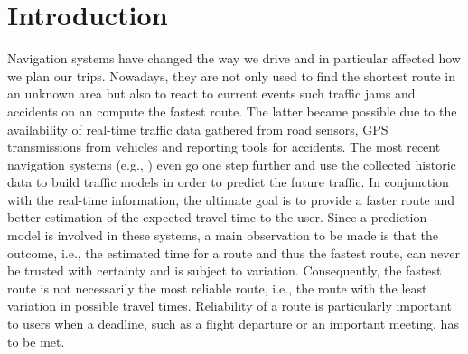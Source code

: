 \vspace{-0.4cm}
\section{Introduction}

Navigation systems have changed the way we drive and in particular affected how we plan our trips. Nowadays, they are not only used to find the shortest route in an unknown area but also to react to current events such traffic jams and accidents on an compute the fastest route. The latter became possible due to the availability of real-time traffic data gathered from road sensors, GPS transmissions from vehicles and reporting tools for accidents. The most recent navigation systems (e.g., \cite{Pan13}) even go one step further and use the collected historic data to build traffic models in order to predict the future traffic. In conjunction with the real-time information, the ultimate goal is to provide a faster route and better estimation of the expected travel time to the user. Since a prediction model is involved in these systems, a main observation to be made is that the outcome, i.e., the estimated time for a route and thus the fastest route, can never be trusted with certainty and is subject to variation. Consequently, the fastest route is not necessarily the most reliable route, i.e., the route with the least variation in possible travel times. Reliability of a route is particularly important to users when a deadline, such as a flight departure or an important meeting, has to be met. 

